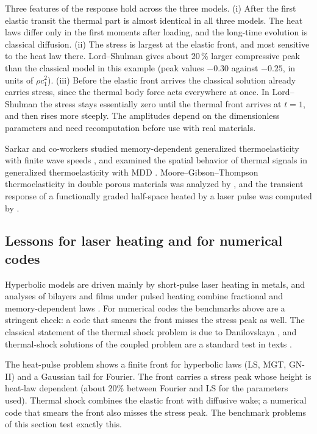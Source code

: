 Three features of the response hold across the three models. (i) After the first elastic transit the thermal part is almost identical in all three models. The heat laws differ only in the first moments after loading, and the long-time evolution is classical diffusion. (ii) The stress is largest at the elastic front, and most sensitive to the heat law there. Lord--Shulman gives about 20\,\% larger compressive peak than the classical model in this example (peak values $-0.30$ against $-0.25$, in units of $\rho c_1^2$). (iii) Before the elastic front arrives the classical solution already carries stress, since the thermal body force acts everywhere at once. In Lord--Shulman the stress stays essentially zero until the thermal front arrives at $t=1$, and then rises more steeply. The amplitudes depend on the dimensionless parameters and need recomputation before use with real materials.

Sarkar and co-workers studied memory-dependent generalized thermoelasticity with finite wave speeds \citep{Sarkar2021}, and examined the spatial behavior of thermal signals in generalized thermoelasticity with MDD \citep{Sarkar2020}. Moore--Gibson--Thompson thermoelasticity in double porous materials was analyzed by \citep{Florea2021}, and the transient response of a functionally graded half-space heated by a laser pulse was computed by \citep{Li2020}.

\subsection{Lessons for laser heating and for numerical codes}
Hyperbolic models are driven mainly by short-pulse laser heating in metals, and analyses of bilayers and films under pulsed heating combine fractional and memory-dependent laws \citep{Li2019}. For numerical codes the benchmarks above are a stringent check: a code that smears the front misses the stress peak as well. The classical statement of the thermal shock problem is due to Danilovskaya \citep{Danilovskaya1950}, and thermal-shock solutions of the coupled problem are a standard test in texts \citep{Boley1960,Nowacki1975,HetnarskiIgnaczak1999}.

\begin{summarybox}[Summary]
The heat-pulse problem shows a finite front for hyperbolic laws (LS, MGT, GN-II) and a Gaussian tail for Fourier. The front carries a stress peak whose height is heat-law dependent (about 20\% between Fourier and LS for the parameters used). Thermal shock combines the elastic front with diffusive wake; a numerical code that smears the front also misses the stress peak. The benchmark problems of this section test exactly this.
\end{summarybox}
